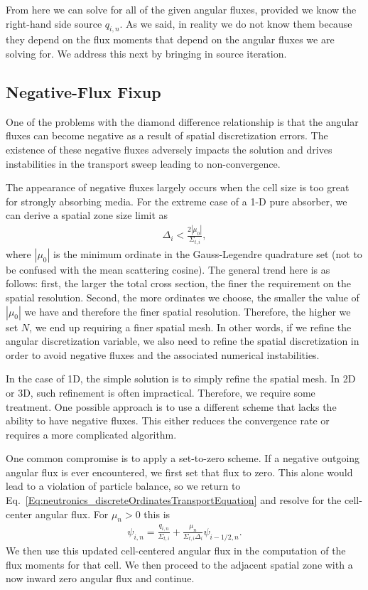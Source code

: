 From here we can solve for all of the given angular fluxes, provided we know the right-hand side source $q_{i,n}$. As we said, in reality we do not know them because they depend on the flux moments that depend on the angular fluxes we are solving for. We address this next by bringing in source iteration.




\subsection{Negative-Flux Fixup}

One of the problems with the diamond difference relationship is that the angular fluxes can become negative as a result of spatial discretization errors. The existence of these negative fluxes adversely impacts the solution and drives instabilities in the transport sweep leading to non-convergence. 

The appearance of negative fluxes largely occurs when the cell size is too great for strongly absorbing media. For the extreme case of a 1-D pure absorber, we can derive a spatial zone size limit as
\begin{align}
  \Delta_i < \frac{ 2 | \mu_0 | }{ \Sigma_{t,i} },
\end{align}
where $| \mu_0 |$ is the minimum ordinate in the Gauss-Legendre quadrature set (not to be confused with the mean scattering cosine). The general trend here is as follows: first, the larger the total cross section, the finer the requirement on the spatial resolution. Second, the more ordinates we choose, the smaller the value of $| \mu_0 |$ we have and therefore the finer spatial resolution. Therefore, the higher we set $N$, we end up requiring a finer spatial mesh. In other words, if we refine the angular discretization variable, we also need to refine the spatial discretization in order to avoid negative fluxes and the associated numerical instabilities.

In the case of 1D, the simple solution is to simply refine the spatial mesh. In 2D or 3D, such refinement is often impractical. Therefore, we require some treatment. One possible approach is to use a different scheme that lacks the ability to have negative fluxes. This either reduces the convergence rate or requires a more complicated algorithm. 

One common compromise is to apply a set-to-zero scheme. If a negative outgoing angular flux is ever encountered, we first set that flux to zero. This alone would lead to a violation of particle balance, so we return to Eq.~\eqref{Eq:neutronics_discreteOrdinatesTransportEquation} and resolve for the cell-center angular flux. For $\mu_n > 0$ this is
\begin{align}
  \psi_{i,n} = \frac{q_{i,n}}{\Sigma_{t,i}} + \frac{\mu_n}{\Sigma_{t,i} \Delta_i } \psi_{i-1/2,n} .
\end{align}
We then use this updated cell-centered angular flux in the computation of the flux moments for that cell. We then proceed to the adjacent spatial zone with a now inward zero angular flux and continue.

